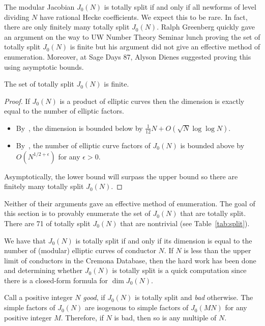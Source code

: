 The modular Jacobian $J_0(N)$ is totally split if and only if all newforms of
level dividing $N$ have rational Hecke coefficients. We expect this to be rare.
In fact, there are only finitely many totally split $J_0(N)$. Ralph Greenberg
quickly gave an argument on the way to UW Number Theory Seminar lunch proving
the set of totally split $J_0(N)$ is finite but his argument did not give an
effective method of enumeration. Moreover, at Sage Days 87, Alyson Dienes
suggested proving this using asymptotic bounds.
\begin{proposition}%
    \label{prop:totally_split}
    The set of totally split $J_0(N)$ is finite.
\end{proposition}
\begin{proof}
    If $J_0(N)$ is a product of elliptic curves then the dimension is
    exactly equal to the number of elliptic factors.
    \begin{itemize}
        \item
            By~\cite[Thm. 6]{martin:dimension}, the dimension is bounded below
            by $\frac{1}{12}N + O(\sqrt{N}\log\log N)$.
        \item
            By~\cite[Cor. 2]{brumer-silverman:number}, the number of elliptic
            curve factors of $J_0(N)$ is bounded above by $O(N^{1/2+\epsilon})$
            for any $\epsilon>0$.
    \end{itemize}
    Asymptotically, the lower bound will surpass the upper bound so there are
    finitely many totally split $J_0(N)$.
\end{proof}
Neither of their arguments gave an effective method of enumeration. The goal of
this section is to provably enumerate the set of $J_0(N)$ that are totally
split. There are 71 of totally split $J_0(N)$ that are nontrivial (see
Table~\ref{tab:split}).

We have that $J_0(N)$ is totally split if and only if its dimension is equal to
the number of (modular) elliptic curves of conductor $N$. If $N$ is less than
the upper limit of conductors in the Cremona Database, then the hard work has
been done and determining whether $J_0(N)$ is totally split is a quick
computation since there is a closed-form formula for $\dim J_0(N)$.

Call a positive integer $N$ \emph{good}, if $J_0(N)$ is totally split and
\emph{bad} otherwise. The simple factors of $J_0(N)$ are isogenous to simple
factors of $J_0(MN)$ for any positive integer $M$. Therefore, if $N$ is bad,
then so is any multiple of $N$. 

